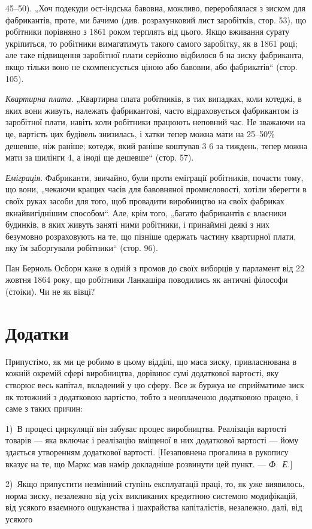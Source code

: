 \parcont{}  %
45--50). „Хоч подекуди ост-індська бавовна, можливо, перероблялася
з зиском для фабрикантів, проте, ми бачимо (див. розрахунковий
лист заробітків, стор. 53), що робітники порівняно
з 1861 роком терплять від цього. Якщо вживання сурату укріпиться,
то робітники вимагатимуть такого самого заробітку, як
в 1861 році; але таке підвищення заробітної плати серйозно
відбилося б на зиску фабриканта, якщо тільки воно не скомпенсується
ціною або бавовни, або фабрикатів“ (стор. 105).

\emph{Квартирна плата}. „Квартирна плата робітників, в тих випадках,
коли котеджі, в яких вони живуть, належать фабрикантові,
часто відраховується фабрикантом із заробітної плати,
навіть коли робітники працюють неповний час. Не зважаючи
на це, вартість цих будівель знизилась, і хатки тепер можна
мати на 25--50\% дешевше, ніж раніше; котедж, який раніше
коштував 3 6 за тиждень, тепер можна мати за шилінги 4, а іноді ще дешевше“ (стор. 57).

\emph{Еміграція}. Фабриканти, звичайно, були проти еміграції робітників,
почасти тому, що вони, „чекаючи кращих часів для бавовняної
промисловості, хотіли зберегти в своїх руках засоби
для того, щоб провадити виробництво на своїх фабриках якнайвигіднішим
способом“. Але, крім того, „багато фабрикантів
є власники будинків, в яких живуть заняті ними робітники,
і принаймні деякі з них безумовно розраховують на те, що
пізніше одержать частину квартирної плати, яку їм заборгували
робітники“ (стор. 96).

Пан Берноль Осборн каже в одній з промов до своїх виборців
у парламент від 22 жовтня 1864 року, що робітники
Ланкашіра поводились як античні філософи (стоіки). Чи не як вівці?

\section{Додатки}

Припустімо, як ми це робимо в цьому відділі, що маса
зиску, привласнювана в кожній окремій сфері виробництва, дорівнює
сумі додаткової вартості, яку створює весь капітал, вкладений
у цю сферу. Все ж буржуа не сприйматиме зиск як тотожний
з додатковою вартістю, тобто з неоплаченою додатковою
працею, і саме з таких причин:

1)~В процесі циркуляції він забуває процес виробництва.
Реалізація вартості товарів — яка включає і реалізацію вміщеної
в них додаткової вартості — йому здається утворенням додаткової
вартості. [Незаповнена прогалина в рукопису вказує на те,
що Маркс мав намір докладніше розвинути цей пункт. — \emph{Ф.~Е.}]

2)~Якщо припустити незмінний ступінь експлуатації праці, то,
як уже виявилось, норма зиску, незалежно від усіх викликаних
кредитною системою модифікацій, від усякого взаємного ошуканства
і шахрайства капіталістів, незалежно, далі, від усякого
\parbreak{}  %
